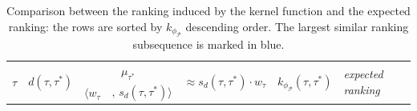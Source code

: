 \begin{table}[!t]
	\caption{Comparison between the ranking induced by the kernel function and the expected ranking: the rows are sorted by $k_{\phi_{\mathcal{P}}}$ descending order. The largest similar ranking subsequence is marked in blue.}\label{tab:rank3}
	\centering
	
	\begin{tabular}{lc|ll|cc|l}
		\toprule
		
		\multirow{2}{*}{$\tau$} &
		\multirow{2}{*}{$d(\tau,\tau^*)$} &
		\multicolumn{2}{c|}{$\mu_{\tau^*}$} &
		\multirow{2}{*}{$\approx s_d(\tau,\tau^*)\cdot w_\tau$} &
		\multirow{2}{*}{$k_{\phi_{\mathcal{P}}}(\tau,\tau^*)$}&
		\multirow{2}{*}{\textit{expected ranking}}\\
		
		\cline{3-4} &&  $\langle w_\tau$ &  $,\,s_d(\tau,\tau^*)\rangle $ && \\
		

\end{tabular}
\end{table}
